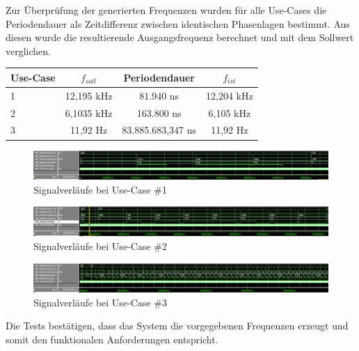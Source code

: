 \noindent Zur Überprüfung der generierten Frequenzen wurden für alle Use-Cases die Periodendauer als Zeitdifferenz zwischen identischen Phasenlagen bestimmt.
Aus diesen wurde die resultierende Ausgangsfrequenz berechnet und mit dem Sollwert verglichen.
\\
\begin{table}[h]
    \centering
    \begin{tabular}{lccc}
        \toprule
        \textbf{Use-Case} & \textbf{$f_{soll}$} & \textbf{Periodendauer} & \textbf{$f_{ist}$} \\
        \midrule
        1 & 12,195 kHz & 81.940 ns & 12,204 kHz \\
        2 & 6,1035 kHz & 163.800 ns & 6,105 kHz \\
        3 & 11,92 Hz & 83.885.683,347 ns & 11,92 Hz \\
        \bottomrule
    \end{tabular}
\end{table}

\begin{figure}[h!]
    \centering
    \includegraphics[width=\linewidth]{img/simulation_algo_uc1.png}
    \caption{Signalverläufe bei Use-Case \#1}
    \label{fig:sim_algo_uc1}
\end{figure}
\begin{figure}[h!]
    \centering
    \includegraphics[width=\linewidth]{img/simulation_algo_uc2.png}
    \caption{Signalverläufe bei Use-Case \#2}
    \label{fig:sim_algo_uc2}
\end{figure}
\begin{figure}[h!]
    \centering
    \includegraphics[width=\linewidth]{img/simulation_algo_uc3_1.png}
    \caption{Signalverläufe bei Use-Case \#3}
    \label{fig:sim_algo_uc3}
\end{figure}

\noindent Die Tests bestätigen, dass das System die vorgegebenen Frequenzen erzeugt und somit den funktionalen Anforderungen entspricht.
